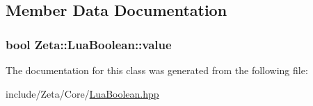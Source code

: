 \subsection{Member Data Documentation}
\hypertarget{classZeta_1_1LuaBoolean_ad22a5b12f437e27fa9b79e8765085ec7}{
\subsubsection[{value}]{\setlength{\rightskip}{0pt plus 5cm}bool Zeta\+::\+Lua\+Boolean\+::value\hspace{0.3cm}{\ttfamily [private]}}}\label{classZeta_1_1LuaBoolean_ad22a5b12f437e27fa9b79e8765085ec7}


The documentation for this class was generated from the following file\+:\begin{DoxyCompactItemize}
\item 
include/\+Zeta/\+Core/\hyperlink{LuaBoolean_8hpp}{Lua\+Boolean.\+hpp}\end{DoxyCompactItemize}
